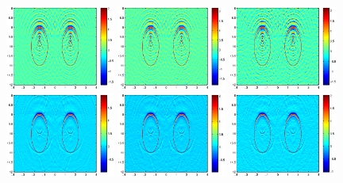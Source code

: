 \documentclass[12pt]{iopart}
\begin{document}
{\begin{figure}
	\centering
	\includegraphics[width=0.32\textwidth]{./graphic/bi_circle_4pi_error2.eps}
	\includegraphics[width=0.32\textwidth]{./graphic/bi_circle_4pi_error4.eps}
	\includegraphics[width=0.32\textwidth]{./graphic/bi_circle_4pi_error6.eps}
	\includegraphics[width=0.32\textwidth]{./graphic/bi_circle_multi_2_8_error2.eps}
	\includegraphics[width=0.32\textwidth]{./graphic/bi_circle_multi_2_8_error4.eps}
	\includegraphics[width=0.32\textwidth]{./graphic/bi_circle_multi_2_8_error6.eps}
	

\end{figure}}
\end{document}
